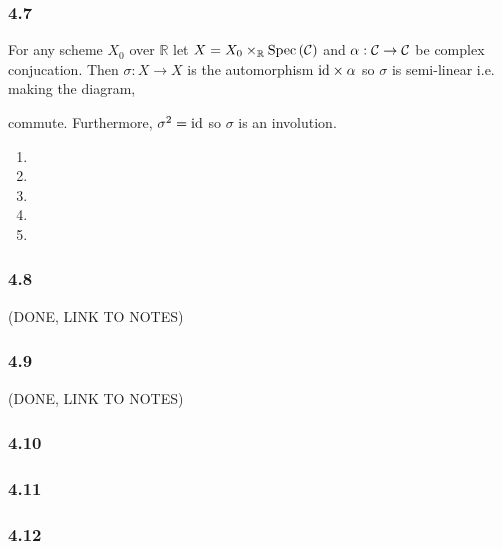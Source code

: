 \documentclass[12pt]{article}
\begin{document}
\subsubsection{4.7}

\newcommand{\R}{\mathbb{R}}

For any scheme $X_0$ over $\R$ let $X = X_0 \times_\R \Spec{\C}$ and $\alpha : \mathcal{C} \to \mathcal{C}$ be complex conjucation. Then $\sigma : X \to X$ is the automorphism $\mathrm{id} \times \alpha$ so $\sigma$ is semi-linear i.e. making the diagram,
\begin{center}
\end{center}
commute. Furthermore, $\sigma^2 = \mathrm{id}$ so $\sigma$ is an involution.

\begin{enumerate}
\item 

\item 

\item

\item

\item
\end{enumerate}

\subsubsection{4.8}

(DONE, LINK TO NOTES)

\subsubsection{4.9}

(DONE, LINK TO NOTES)

\subsubsection{4.10}

\subsubsection{4.11}

\subsubsection{4.12}
\end{document}
